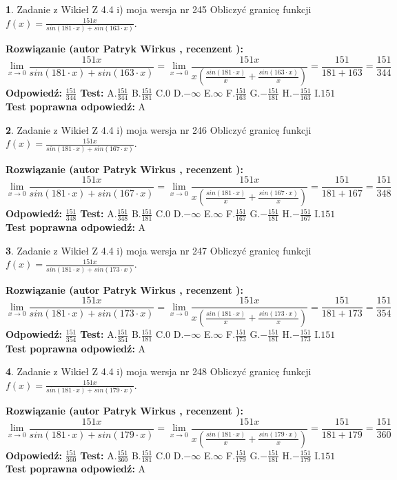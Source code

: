 \documentclass[12pt, a4paper]{article}
\theoremstyle{definition} %
\newtheorem{zad}{}
\newcommand{\zadStart}[1]{\begin{zad}#1\newline}
\newcommand{\zadStop}{\end{zad}}
\newcommand{\rozwStart}[2]{\noindent \textbf{Rozwiązanie (autor #1 , recenzent #2): }\newline}
\newcommand{\rozwStop}{\newline}
\newcommand{\odpStart}{\noindent \textbf{Odpowiedź:}\newline}
\newcommand{\odpStop}{\newline}
\newcommand{\testStart}{\noindent \textbf{Test:}\newline}
\newcommand{\testStop}{\newline}
\newcommand{\kluczStart}{\noindent \textbf{Test poprawna odpowiedź:}\newline}
\newcommand{\kluczStop}{\newline}
\begin{document}
\zadStart{Zadanie z Wikieł Z 4.4 i) moja wersja nr 245}
Obliczyć granicę funkcji $f(x)=\frac{151x}{sin(181\cdot x) +sin(163\cdot x)}$.
\zadStop
\rozwStart{Patryk Wirkus}{}
$$\lim\limits_{x\to 0}\frac{151x}{sin(181\cdot x) +sin(163\cdot x)}=\lim\limits_{x\to 0}\frac{151x}{x(\frac{sin(181\cdot x)}{x}+\frac{sin(163\cdot x)}{x})}=\frac{151}{181+163} = \frac{151}{344}$$
\rozwStop
\odpStart
$\frac{151}{344}$
\odpStop
\testStart
A.$\frac{151}{344}$
B.$\frac{151}{181}$
C.$0$
D.$-\infty$
E.$\infty$
F.$\frac{151}{163}$
G.$-\frac{151}{181}$
H.$-\frac{151}{163}$
I.$151$
\testStop
\kluczStart
A
\kluczStop



\zadStart{Zadanie z Wikieł Z 4.4 i) moja wersja nr 246}
Obliczyć granicę funkcji $f(x)=\frac{151x}{sin(181\cdot x) +sin(167\cdot x)}$.
\zadStop
\rozwStart{Patryk Wirkus}{}
$$\lim\limits_{x\to 0}\frac{151x}{sin(181\cdot x) +sin(167\cdot x)}=\lim\limits_{x\to 0}\frac{151x}{x(\frac{sin(181\cdot x)}{x}+\frac{sin(167\cdot x)}{x})}=\frac{151}{181+167} = \frac{151}{348}$$
\rozwStop
\odpStart
$\frac{151}{348}$
\odpStop
\testStart
A.$\frac{151}{348}$
B.$\frac{151}{181}$
C.$0$
D.$-\infty$
E.$\infty$
F.$\frac{151}{167}$
G.$-\frac{151}{181}$
H.$-\frac{151}{167}$
I.$151$
\testStop
\kluczStart
A
\kluczStop



\zadStart{Zadanie z Wikieł Z 4.4 i) moja wersja nr 247}
Obliczyć granicę funkcji $f(x)=\frac{151x}{sin(181\cdot x) +sin(173\cdot x)}$.
\zadStop
\rozwStart{Patryk Wirkus}{}
$$\lim\limits_{x\to 0}\frac{151x}{sin(181\cdot x) +sin(173\cdot x)}=\lim\limits_{x\to 0}\frac{151x}{x(\frac{sin(181\cdot x)}{x}+\frac{sin(173\cdot x)}{x})}=\frac{151}{181+173} = \frac{151}{354}$$
\rozwStop
\odpStart
$\frac{151}{354}$
\odpStop
\testStart
A.$\frac{151}{354}$
B.$\frac{151}{181}$
C.$0$
D.$-\infty$
E.$\infty$
F.$\frac{151}{173}$
G.$-\frac{151}{181}$
H.$-\frac{151}{173}$
I.$151$
\testStop
\kluczStart
A
\kluczStop



\zadStart{Zadanie z Wikieł Z 4.4 i) moja wersja nr 248}
Obliczyć granicę funkcji $f(x)=\frac{151x}{sin(181\cdot x) +sin(179\cdot x)}$.
\zadStop
\rozwStart{Patryk Wirkus}{}
$$\lim\limits_{x\to 0}\frac{151x}{sin(181\cdot x) +sin(179\cdot x)}=\lim\limits_{x\to 0}\frac{151x}{x(\frac{sin(181\cdot x)}{x}+\frac{sin(179\cdot x)}{x})}=\frac{151}{181+179} = \frac{151}{360}$$
\rozwStop
\odpStart
$\frac{151}{360}$
\odpStop
\testStart
A.$\frac{151}{360}$
B.$\frac{151}{181}$
C.$0$
D.$-\infty$
E.$\infty$
F.$\frac{151}{179}$
G.$-\frac{151}{181}$
H.$-\frac{151}{179}$
I.$151$
\testStop
\kluczStart
A
\kluczStop
\end{document}
